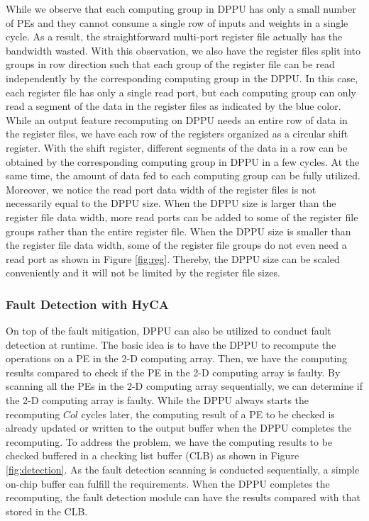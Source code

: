 While we observe that each computing group in DPPU has only a small number of PEs and they cannot consume a single row of inputs and weights in a single cycle. As a result, the straightforward multi-port register file actually has the bandwidth wasted. With this observation, we also have the register files split into groups in row direction such that each group of the register file can be read independently by the corresponding computing group in the DPPU. In this case, each register file has only a single read port, but each computing group can only read a segment of the data in the register files as indicated by the blue color. While an output feature recomputing on DPPU needs an entire row of data in the register files, we have each row of the registers organized as a circular shift register. With the shift register, different segments of the data in a row can be obtained by the corresponding computing group in DPPU in a few cycles. At the same time, the amount of data fed to each computing group can be fully utilized. Moreover, we notice the read port data width of the register files is not necessarily equal to the DPPU size. When the DPPU size is larger than the register file data width, more read ports can be added to some of the register file groups rather than the entire register file. When the DPPU size is smaller than the register file data width, some of the register file groups do not even need a read port as shown in Figure \ref{fig:reg}. Thereby, the DPPU size can be scaled conveniently and it will not be limited by the register file sizes. 

\subsubsection{Fault Detection with HyCA}
On top of the fault mitigation, DPPU can also be utilized to conduct fault detection at runtime. The basic idea is to have the DPPU to recompute the operations on a PE in the 2-D computing array. Then, we have the computing results compared to check if the PE in the 2-D computing array is faulty. By scanning all the PEs in the 2-D computing array sequentially, we can determine if the 2-D computing array is faulty. While the DPPU always starts the recomputing $Col$ cycles later, the computing result of a PE to be checked is already updated or written to the output buffer when the DPPU completes the recomputing. To address the problem, we have the computing results to be checked buffered in a checking list buffer (CLB) as shown in Figure \ref{fig:detection}. As the fault detection scanning is conducted sequentially, a simple on-chip buffer can fulfill the requirements. When the DPPU completes the recomputing, the fault detection module can have the results compared with that stored in the CLB.  

